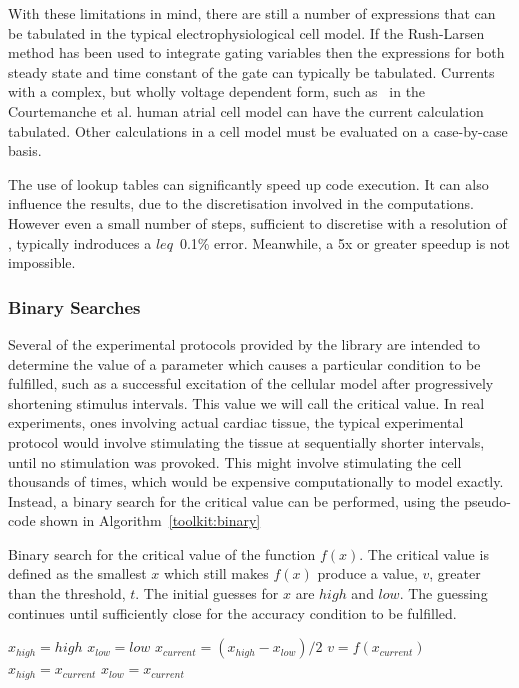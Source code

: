 With these limitations in mind, there are still a number of expressions that can
be tabulated in the typical electrophysiological cell model.
If the Rush-Larsen method has been used to integrate gating variables then the
expressions for both steady state and time constant of the gate can typically be
tabulated.
Currents with a complex, but wholly voltage dependent form, such as \ in
the Courtemanche et al. human atrial cell model can have the current calculation
tabulated.
Other calculations in a cell model must be evaluated on a case-by-case basis.

The use of lookup tables can significantly speed up code execution.
It can also influence the results, due to the discretisation involved in the
computations.
However even a small number of steps, sufficient to discretise with a
resolution of , typically indroduces a $leq$~0.1\% error.
Meanwhile, a 5x or greater speedup is not impossible.

\subsubsection{Binary Searches}

Several of the experimental protocols provided by the library are intended to
determine the value of a parameter which causes a particular condition to be
fulfilled, such as a successful excitation of the cellular model after
progressively shortening stimulus intervals.  This value we will call the
critical value. In real experiments, ones involving actual cardiac tissue, the
typical experimental protocol would involve stimulating the tissue at
sequentially shorter intervals, until no stimulation was provoked.  This might
involve stimulating the cell thousands of times, which would be expensive
computationally to model exactly.  Instead, a binary search for the critical
value can be performed, using the pseudo-code shown in Algorithm~\ref{toolkit:binary}

\begin{algorithm}
\caption{
Binary search for the critical value of the function $f(x)$.
The critical value is defined as the smallest $x$ which still makes $f(x)$
produce a value, $v$, greater than the threshold, $t$.
The initial guesses for $x$ are $high$ and $low$.
The guessing continues until sufficiently close for the accuracy condition to be
fulfilled.
}
\label{toolkit:binary}
\begin{algorithmic}
\STATE $x_{high} = high$
\STATE $x_{low} = low$
\REPEAT
\STATE $x_{current} = \left(x_{high} - x_{low}\right) / 2$
\STATE $v = f\!\left(x_{current}\right)$
\STATE $x_{high} = x_{current}$
\ELSE
\STATE $x_{low} = x_{current}$
\ENDIF
{}
\end{algorithmic}
\end{algorithm}

